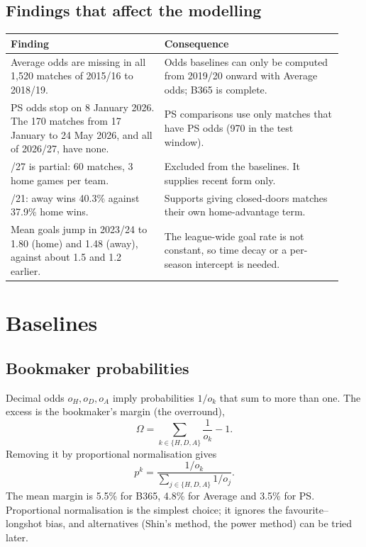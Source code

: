 \documentclass[12pt,a4paper]{article}
\newcommand{\tabfont}{\small\setstretch{1.05}}
\begin{document}
\subsection{Findings that affect the modelling}

\begingroup
\tabfont
\renewcommand{\arraystretch}{1.25}
\begin{tabular}{@{}>{\raggedright\arraybackslash}p{0.43\linewidth}>{\raggedright\arraybackslash}p{0.5\linewidth}@{}}
\toprule
\textbf{Finding} & \textbf{Consequence}\\
\midrule
Average odds are missing in all 1{,}520 matches of 2015/16 to 2018/19. &
Odds baselines can only be computed from 2019/20 onward with Average odds; B365 is complete.\\
PS odds stop on 8 January 2026. The 170 matches from 17 January to 24 May 2026, and all of 2026/27,
have none. &
PS comparisons use only matches that have PS odds (970 in the test window).\\
2026/27 is partial: 60 matches, 3 home games per team. &
Excluded from the baselines. It supplies recent form only.\\
2020/21: away wins 40.3\% against 37.9\% home wins. &
Supports giving closed-doors matches their own home-advantage term.\\
Mean goals jump in 2023/24 to 1.80 (home) and 1.48 (away), against about 1.5 and 1.2 earlier. &
The league-wide goal rate is not constant, so time decay or a per-season intercept is needed.\\
\bottomrule
\end{tabular}
\endgroup

\section{Baselines}

\subsection{Bookmaker probabilities}

Decimal odds $o_H,o_D,o_A$ imply probabilities $1/o_k$ that sum to more than one. The excess is the
bookmaker's margin (the overround),
\[
\Omega=\sum_{k\in\{H,D,A\}}\frac{1}{o_k}-1 .
\]
Removing it by proportional normalisation gives
\[
p^{k}=\frac{1/o_k}{\displaystyle\sum_{j\in\{H,D,A\}}1/o_j}.
\]
The mean margin is 5.5\% for B365, 4.8\% for Average and 3.5\% for PS. Proportional normalisation
is the simplest choice; it ignores the favourite--longshot bias, and alternatives (Shin's method, the
power method) can be tried later.
\end{document}
